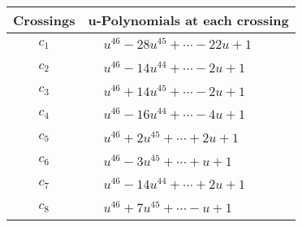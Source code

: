 \documentclass[1p]{elsarticle_modified}
\theoremstyle{definition}
\begin{document}
\begin{tabular}{m{50pt}|m{274pt}}
Crossings & \hspace{64pt}u-Polynomials at each crossing \\
\hline $$\begin{aligned}c_{1}\end{aligned}$$&$\begin{aligned}
&u^{46}-28 u^{45}+\cdots-22 u+1
\end{aligned}$\\
\hline $$\begin{aligned}c_{2}\end{aligned}$$&$\begin{aligned}
&u^{46}-14 u^{44}+\cdots-2 u+1
\end{aligned}$\\
\hline $$\begin{aligned}c_{3}\end{aligned}$$&$\begin{aligned}
&u^{46}+14 u^{45}+\cdots-2 u+1
\end{aligned}$\\
\hline $$\begin{aligned}c_{4}\end{aligned}$$&$\begin{aligned}
&u^{46}-16 u^{44}+\cdots-4 u+1
\end{aligned}$\\
\hline $$\begin{aligned}c_{5}\end{aligned}$$&$\begin{aligned}
&u^{46}+2 u^{45}+\cdots+2 u+1
\end{aligned}$\\
\hline $$\begin{aligned}c_{6}\end{aligned}$$&$\begin{aligned}
&u^{46}-3 u^{45}+\cdots+u+1
\end{aligned}$\\
\hline $$\begin{aligned}c_{7}\end{aligned}$$&$\begin{aligned}
&u^{46}-14 u^{44}+\cdots+2 u+1
\end{aligned}$\\
\hline $$\begin{aligned}c_{8}\end{aligned}$$&$\begin{aligned}
&u^{46}+7 u^{45}+\cdots- u+1
\end{aligned}$\\

\end{tabular}
\end{document}
